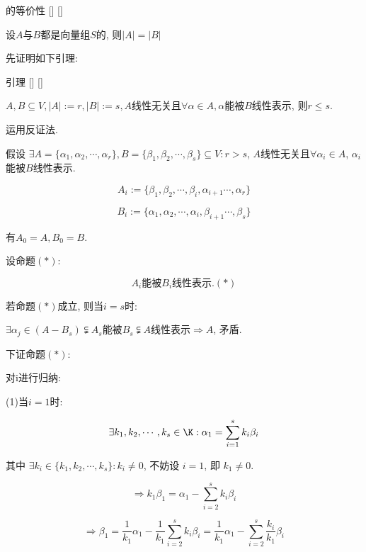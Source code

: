 \documentclass[UTF8]{ctexart}
\begin{document}
		\begin{thm}
			[]
			{ 的等价性}
			[]
			[]

			设$A$与$B$都是向量组$S$的, 则$|A|=|B|$
		\end{thm}
		\begin{prf}
		
			先证明如下引理: 
		\end{prf}
		\begin{lma}
			[]
			{引理}
			[]
			[]

			$A,B\subseteq V, |A|:=r, |B|:=s, A$线性无关且$\forall \alpha\in A, \alpha$能被$B$线性表示, 则$r\leq s$. 
		\end{lma}
		\begin{prf}
		
			运用反证法. 
			
			假设 $\exists A=\{\alpha_{1},\alpha_{2},\cdots, \alpha_{r}\},B=\{\beta_{1},\beta_{2},\cdots, \beta_{s}\}\subseteq V: r>s$, $A$线性无关且$\forall \alpha_{i}\in A$, $\alpha_{i}$能被$B$线性表示. 
			
			$$A_{i}:=\{\beta_{1},\beta_{2},\cdots, \beta_{i}, \alpha_{i+1}\cdots, \alpha_{r}\}$$
			
			$$B_{i}:=\{\alpha_{1},\alpha_{2},\cdots, \alpha_{i}, \beta_{i+1}\cdots, \beta_{s}\}$$
			
			有$A_{0}=A, B_{0}=B$. 
			
			设命题$(*)$: 
			
			$$A_{i}\mbox{能被}B_{i}\mbox{线性表示}. (*)$$
			
			若命题$(*)$成立, 则当$i=s$时: 
			
			$\exists \alpha_{j}\in (A-B_{s})\subsetneqq A_{s}$能被$B_{s}\subsetneqq A$线性表示$\Longrightarrow A$, 矛盾. 
			
			下证命题$(*)$: 
			
			对i进行归纳: 
			
			(1)当$i=1$时: 
			
			$$\exists k_{1},k_{2},\cdots, k_{s}\in \K: \alpha_{1}=\sum_{i=1}^{s}k_{i}\beta_{i}$$
			
			其中 $\exists k_{i}\in \{k_{1},k_{2},\cdots, k_{s}\} :k_{i}\neq 0$, 不妨设 $i=1$, 即 $k_{1}\neq 0$. 
			
			$$\Longrightarrow k_{1}\beta_{1}=\alpha_{1}-\sum_{i=2}^{s}k_{i}\beta_{i}$$
			
			$$\Longrightarrow \beta_{1}=\frac{1}{k_{1}}\alpha_{1}-\frac{1}{k_{1}}\sum_{i=2}^{s}k_{i}\beta_{i}=\frac{1}{k_{1}}\alpha_{1}-\sum_{i=2}^{s}\frac{k_{i}}{k_{1}}\beta_{i}$$
			

\end{prf}
\end{document}
